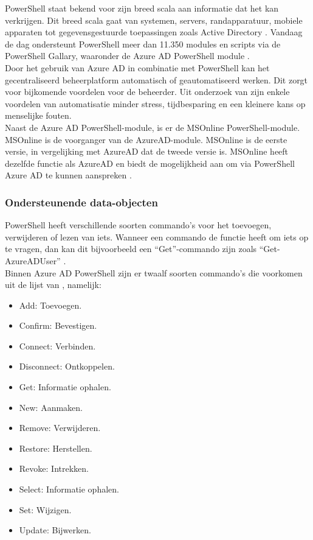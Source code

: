 PowerShell staat bekend voor zijn breed scala aan informatie dat het kan verkrijgen. Dit breed scala gaat van systemen, servers, randapparatuur, mobiele apparaten tot gegevensgestuurde toepassingen zoals Active Directory \autocite{Hosmer2019}. Vandaag de dag ondersteunt PowerShell meer dan 11.350 modules en scripts via de PowerShell Gallary, waaronder de Azure \ac{AD} PowerShell module \autocite{Microsoft2023a}. \\

Door het gebruik van Azure \ac{AD} in combinatie met PowerShell kan het gecentraliseerd beheerplatform automatisch of geautomatiseerd werken. Dit zorgt voor bijkomende voordelen voor de beheerder. Uit onderzoek van \textcite{Breton2003} zijn enkele voordelen van automatisatie minder stress, tijdbesparing en een kleinere kans op menselijke fouten. \\

Naast de Azure \ac{AD} PowerShell-module, is er de MSOnline PowerShell-module. MSOnline is de voorganger van de AzureAD-module. MSOnline is de eerste versie, in vergelijking met AzureAD dat de tweede versie is. MSOnline heeft dezelfde functie als AzureAD en biedt de mogelijkheid aan om via PowerShell Azure \ac{AD} te kunnen aanspreken \autocite{Prigent2019}.

\subsubsection{Ondersteunende data-objecten}


PowerShell heeft verschillende soorten commando's voor het toevoegen, verwijderen of lezen van iets. Wanneer een commando de functie heeft om iets op te vragen, dan kan dit bijvoorbeeld een “Get”-commando zijn zoals “Get-AzureADUser” \autocite{Microsoft2023i}. \\

Binnen Azure AD PowerShell zijn er twaalf soorten commando's die voorkomen uit de lijst van \textcite{Microsoft2023i}, namelijk:

\begin{itemize}
    \item Add: Toevoegen.
    \item Confirm: Bevestigen.
    \item Connect: Verbinden.
    \item Disconnect: Ontkoppelen.
    \item Get: Informatie ophalen.
    \item New: Aanmaken.
    \item Remove: Verwijderen.
    \item Restore: Herstellen.
    \item Revoke: Intrekken.
    \item Select: Informatie ophalen.
    \item Set: Wijzigen.
    \item Update: Bijwerken.
\end{itemize}


